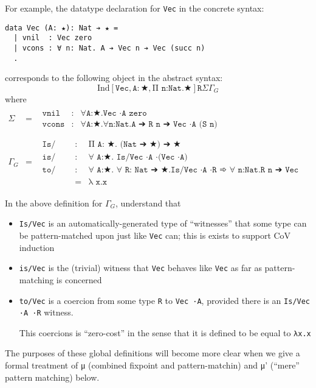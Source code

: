 \documentclass{article}
\newcommand{\ann}[2]{#1\! : \! #2}
\newcommand{\indsche}[3]{\ensuremath{\text{Ind}[#1,#2,#3]}}
\begin{document}
For example, the datatype declaration for \texttt{Vec} in the concrete syntax:
\begin{verbatim}
data Vec (A: ★): Nat ➔ ★ =
  | vnil  : Vec zero
  | vcons : ∀ n: Nat. A ➔ Vec n ➔ Vec (succ n)
  .
\end{verbatim}

corresponds to the following object in the abstract syntax:
\[
  \indsche{\texttt{Vec}}{\ann{\texttt{A}}{★}}{\texttt{Π n:Nat.★}}{\texttt{R}}{\Sigma}{\Gamma_G}
\]
\noindent where
\[
  \begin{array}{lcl}
    \Sigma
    & =
    & \begin{array}{lcl}
        \texttt{vnil} & : & \texttt{∀A:★.Vec ·A zero}
        \\ \texttt{vcons} & : & \texttt{∀A:★.∀n:Nat.A ➔ R n ➔ Vec ·A (S n)}
      \end{array}
    \\ \\ \Gamma_G
    & =
    & \begin{array}{lcl}
        \texttt{Is/Vec} & : & \texttt{Π A: ★. (Nat ➔ ★) ➔ ★}
        \\ \texttt{is/Vec} & : & \texttt{∀ A:★. Is/Vec ·A ·(Vec ·A)}
        \\ \texttt{to/Vec} & : & \texttt{∀ A:★. ∀ R: Nat ➔ ★.Is/Vec ·A ·R ➾ ∀ n:Nat.R n ➔ Vec ·A n}
        \\                 & = & \texttt{λ x.x}
      \end{array}
  \end{array}
\]

\noindent In the above definition for $\Gamma_G$, understand that
\begin{itemize}
  \item \texttt{Is/Vec} is an automatically-generated type of ``witnesses''
    that some type can be pattern-matched upon just like \texttt{Vec} can; this
    is exists to support CoV induction
  \item \texttt{is/Vec} is the (trivial) witness that \texttt{Vec} behaves like
    \texttt{Vec} as far as pattern-matching is concerned
  \item \texttt{to/Vec} is a coercion from some type \texttt{R} to \texttt{Vec ·A},
    provided there is an \texttt{Is/Vec ·A ·R} witness.

    This coercions is ``zero-cost'' in the sense that it is defined to be equal
    to \texttt{λx.x}
\end{itemize}

The purposes of these global definitions will become more clear when we give a
formal treatment of μ (combined fixpoint and pattern-matchin) and μ' (``mere''
pattern matching) below.
\end{document}
